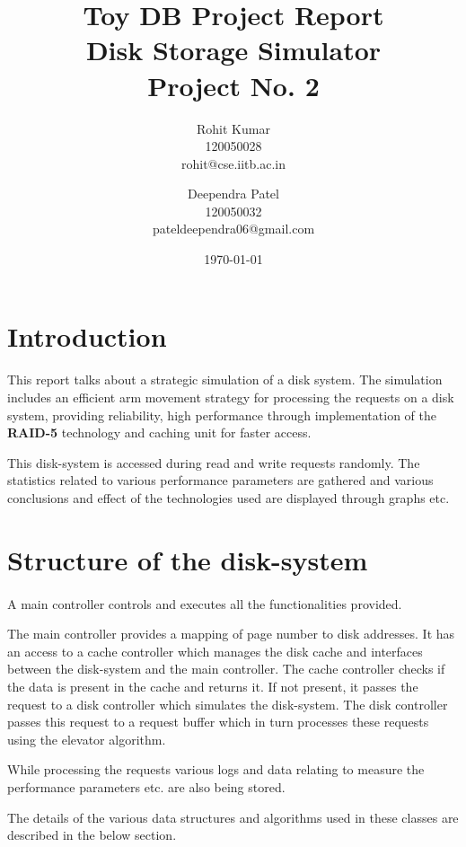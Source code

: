 \documentclass[11pt]{article}
\title{\textbf{Toy DB Project Report \\ 
	Disk Storage Simulator \\
	Project No. 2 }}
\author{Rohit Kumar \\ 120050028 \\ rohit@cse.iitb.ac.in
		\and 
		Deependra Patel \\ 120050032 \\ pateldeependra06@gmail.com
		}
\date{\today}
\begin{document}
\maketitle

\section{Introduction}
\paragraph{}

This report talks about a strategic simulation of a disk system. The simulation includes an efficient arm movement strategy for processing the requests on a disk system, providing reliability, high performance through implementation of the \textbf{RAID-5} technology and caching unit for faster access. 

This disk-system is accessed during read and write requests randomly. The statistics related to various performance parameters are gathered and various conclusions and effect of the technologies used are displayed through graphs etc.
	
\section{Structure of the disk-system}
\paragraph{}

A main controller controls and executes all the functionalities provided. 

The main controller provides a mapping of page number to disk addresses. It has an access to a cache controller which manages the disk cache and interfaces between the disk-system and the main controller. The cache controller checks if the data is present in the cache and returns it. If not present, it passes the request to a disk controller which simulates the disk-system. The disk controller passes this request to a request buffer which in turn processes these requests using the elevator algorithm.

While processing the requests various logs and data relating to measure the performance parameters etc. are also being stored.

The details of the various data structures and algorithms used in these classes are described in the below section.
\end{document}
